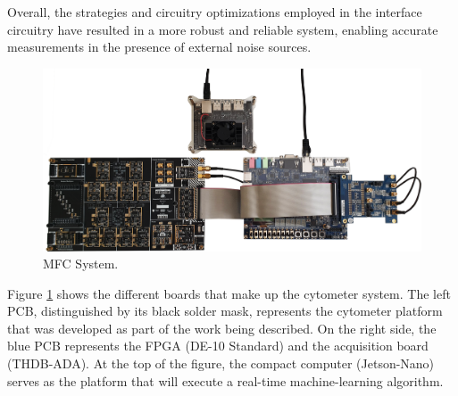 Overall, the strategies and circuitry optimizations employed in the interface circuitry have resulted in a more robust and reliable system, enabling accurate measurements in the presence of external noise sources.

\begin{figure}[!htbp]
    \centering
    \includegraphics[width=.9\textwidth]{figs/system.png}
    \caption{MFC System.}
    \label{fig:mfc}
\end{figure}

Figure \ref{fig:mfc} shows the different boards that make up the cytometer system. The left PCB, distinguished by its black solder mask, represents the cytometer platform that was developed as part of the work being described. On the right side, the blue PCB represents the FPGA (DE-10 Standard) and the acquisition board (THDB-ADA). At the top of the figure, the compact computer (Jetson-Nano) serves as the platform that will execute a real-time machine-learning algorithm.